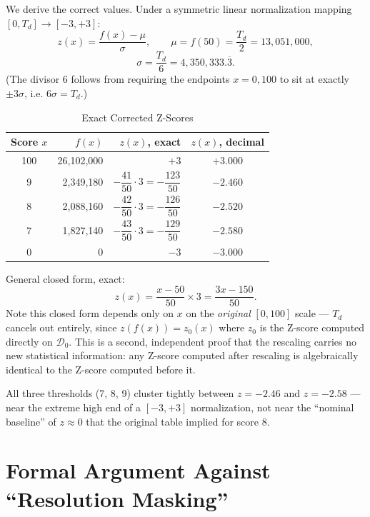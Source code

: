 \documentclass[10pt,journal,compsoc]{IEEEtran}
\begin{document}
We derive the correct values. Under a symmetric linear normalization mapping $[0,T_d] \to [-3,+3]$:
\begin{equation}
    z(x) = \frac{f(x) - \mu}{\sigma}, \qquad \mu = f(50) = \frac{T_d}{2} = 13{,}051{,}000,
\end{equation}
\begin{equation}
    \sigma = \frac{T_d}{6} = 4{,}350{,}333.\overline{3}.
\end{equation}
(The divisor 6 follows from requiring the endpoints $x=0,100$ to sit at exactly $\pm 3\sigma$, i.e. $6\sigma = T_d$.)

\begin{table}[h]
\centering
\caption{Exact Corrected Z-Scores}
\begin{tabular}{crrc}
\toprule
\textbf{Score $x$} & \textbf{$f(x)$} & \textbf{$z(x)$, exact} & \textbf{$z(x)$, decimal} \\
\midrule
100 & 26,102,000 & $+3$ & $+3.000$ \\
9   & 2,349,180  & $-\dfrac{41}{50}\cdot 3 = -\dfrac{123}{50}$ & $-2.460$ \\
8   & 2,088,160  & $-\dfrac{42}{50}\cdot 3 = -\dfrac{126}{50}$ & $-2.520$ \\
7   & 1,827,140  & $-\dfrac{43}{50}\cdot 3 = -\dfrac{129}{50}$ & $-2.580$ \\
0   & 0          & $-3$ & $-3.000$ \\
\bottomrule
\end{tabular}
\end{table}

General closed form, exact:
\begin{equation}
    z(x) = \frac{x-50}{50}\times 3 = \frac{3x - 150}{50}.
\end{equation}
Note this closed form depends only on $x$ on the \emph{original} $[0,100]$ scale — $T_d$ cancels out entirely, since $z(f(x)) = z_0(x)$ where $z_0$ is the Z-score computed directly on $\mathcal{D}_0$. This is a second, independent proof that the rescaling carries no new statistical information: any Z-score computed after rescaling is algebraically identical to the Z-score computed before it.

All three thresholds (7, 8, 9) cluster tightly between $z=-2.46$ and $z=-2.58$ — near the extreme high end of a $[-3,+3]$ normalization, not near the ``nominal baseline'' of $z\approx 0$ that the original table implied for score 8.

\section{Formal Argument Against ``Resolution Masking''}
\end{document}
